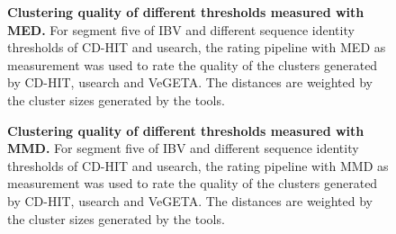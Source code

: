     \begin{figure}[!htb]
        \centering
        \caption[Clustering quality of different thresholds measured with \gls{MED}]%
        {\textbf{Clustering quality of different thresholds measured with \gls{MED}.}%
        For segment five of \gls{IBV} and different sequence identity thresholds of CD-HIT and usearch, the rating pipeline with \gls{MED} as measurement was used to rate the quality of the clusters generated by CD-HIT, usearch and VeGETA. The distances are weighted by the cluster sizes generated by the tools.}
        \label{fig:3.9}
    \end{figure}
    
    \begin{figure}[!htb]
        \centering
        \caption[Clustering quality of different thresholds measured with \gls{MMD}]%
        {\textbf{Clustering quality of different thresholds measured with \gls{MMD}.}%
        For segment five of \gls{IBV} and different sequence identity thresholds of CD-HIT and usearch, the rating pipeline with \gls{MMD} as measurement was used to rate the quality of the clusters generated by CD-HIT, usearch and VeGETA. The distances are weighted by the cluster sizes generated by the tools.}
        \label{fig:3.10}
    \end{figure}
    
